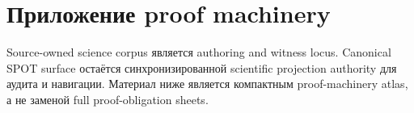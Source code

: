 \section{Приложение proof machinery}
\label{sec:oc13-proof-machinery-appendix-ru}

Source-owned science corpus является authoring and witness locus. Canonical
SPOT surface
остаётся синхронизированной scientific projection authority для аудита и
навигации. Материал ниже является компактным proof-machinery atlas, а не
заменой full proof-obligation sheets.

\begingroup
\footnotesize
\RaggedRight
\sloppy
\setlength{\tabcolsep}{2pt}
\setlength{\LTleft}{0pt}
\setlength{\LTright}{0pt}

\endgroup
